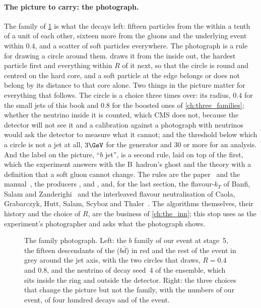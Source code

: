 \paragraph{The picture to carry: the photograph.}
The family of
\cref{fig:family_photograph:photograph_sketch} is what the decays left:
fifteen particles from the \Bbar within a tenth of a unit of each other,
sixteen more from the gluons and the underlying event within $0.4$, and a
scatter of soft particles everywhere. The photograph is a rule for
drawing a circle around them. \antikt draws it from the inside out, the
hardest particle first and everything within $R$ of it next, so that the
circle is round and centred on the hard core, and a soft particle at the
edge belongs or does not belong by its distance to that core alone. Two
things in the picture matter for everything that follows. The circle is
a choice three times over: its radius, $0.4$ for the small jets of this
book and $0.8$ for the boosted ones of \cref{ch:three_families}; whether
the neutrino inside it is counted, which CMS does not, because the
detector will not see it and a calibration against a photograph with
neutrinos would ask the detector to measure what it cannot; and the
threshold below which a circle is not a jet at all, $3\GeV$ for the
generator and $30$ or more for an analysis. And the label on the picture,
``$b$ jet'', is a second rule, laid on top of the first, which the
experiment answers with the B~hadron's ghost and the theory with a
definition that a soft gluon cannot change. The rules are the \antikt
paper~\cite{Cacciari:2008gp} and the \FASTJET manual~\cite{Cacciari:2011ma},
the \CMSSW producers , 
and , and, for the last section, the
flavour-$k_T$ of Banfi, Salam and Zanderighi~\cite{Banfi:2006hf} and the
interleaved flavour neutralisation of Caola, Grabarczyk, Hutt, Salam,
Scyboz and Thaler~\cite{Caletti:2022glq}. The algorithms themselves, their
history and the choice of $R$, are the business of \cref{ch:the_inn}; this
stop uses \antikt as the experiment's photographer and asks what the
photograph shows.

\begin{figure}[htbp]\centering
\resizebox{\textwidth}{!}{}
\caption[The family photograph: the $b$ family and the pictures anti-$k_T$
takes of it]{The family photograph. Left: the $b$ family of our event at
stage~5, the fifteen descendants of the \Bbar ($b\bar d$) in red and the
rest of the event in grey around the jet axis, with the two circles that
\antikt draws, $R=0.4$ and $0.8$, and the neutrino of decay seed~4 of the
ensemble, which sits inside the ring and outside the detector. Right: the
three choices that change the picture but not the family, with the
numbers of our event, of four hundred decays and of the \CMSSW event.}
\label{fig:family_photograph:photograph_sketch}
\end{figure}

